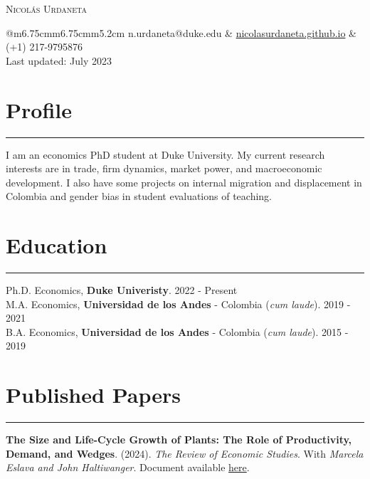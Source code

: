 \documentclass[12pt, letterpaper]{article}
\begin{document}
 

\begin{center}
{\Huge \textsc{Nicolás Urdaneta}}
\vspace*{5mm}

\begin{tabular}{@{}m{6.75cm}m{6.75cm}m{5.2cm}}
\noindent n.urdaneta@duke.edu & \href{nicolasurdaneta.github.io}{nicolasurdaneta.github.io} & (+1) 217-9795876 \\
Last updated: July 2023
\end{tabular}
\vspace*{-7mm}

\end{center}
\section*{Profile}
\vspace*{-8mm}
\noindent \rule{\linewidth}{0.2mm}
\noindent I am an economics PhD student at Duke University. My current research interests are in trade, firm dynamics, market power, and macroeconomic development. I also have some projects on internal migration and displacement in Colombia and gender bias in student evaluations of teaching. 

\vspace*{-4mm}

\section*{Education}
\vspace*{-8mm}
\noindent \rule{\linewidth}{0.2mm}
\noindent
Ph.D. Economics, \textbf{Duke Univeristy}. \hfill 2022 - Present \\
M.A. Economics, \textbf{Universidad de los Andes} - Colombia (\textit{cum laude}). \hfill 2019 - 2021 \\
B.A. Economics, \textbf{Universidad de los Andes} - Colombia (\textit{cum laude}). \hfill 2015 - 2019

\vspace*{-2mm}

\section*{Published Papers}
\vspace*{-8mm}
\noindent \rule{\linewidth}{0.2mm}
\noindent \textbf{The Size and Life-Cycle Growth of Plants: The Role of Productivity, Demand, and Wedges}. (2024). \textit{The Review of Economic Studies}.   With \textit{Marcela Eslava and John Haltiwanger}. Document available \href{https://academic.oup.com/restud/advance-article/doi/10.1093/restud/rdad029/7054272?login=true}{here}. 
\end{document}
